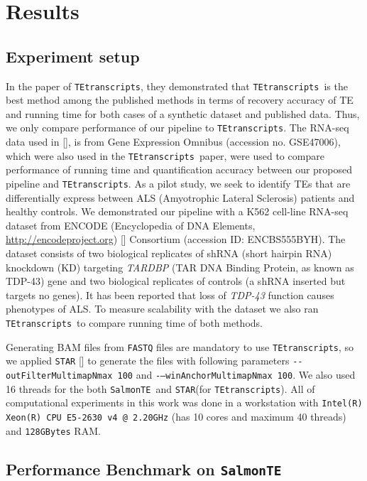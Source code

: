\documentclass{ws-procs11x85}
\newcommand{\TEtranscripts}{\texttt{TEtranscripts}}
\newcommand{\SalmonTE}{\texttt{SalmonTE}}
\begin{document}
\section{Results}

\subsection{Experiment setup}
In the paper of \TEtranscripts, they demonstrated that \TEtranscripts~is the best method among the published methods in terms of recovery accuracy of TE and running time for both cases of a synthetic dataset and published data. 
Thus, we only compare performance of our pipeline to \TEtranscripts. 
The RNA-seq data used in [], is from Gene Expression Omnibus (accession no. GSE47006), which were also used in the \TEtranscripts~paper, 
were used to compare performance of running time and quantification accuracy between
our proposed pipeline and \TEtranscripts.
As a pilot study, we seek to identify TEs that are  differentially express between ALS (Amyotrophic Lateral Sclerosis)  patients and healthy  controls.
We demonstrated our pipeline with a K562 cell-line RNA-seq dataset from ENCODE (Encyclopedia of DNA Elements, \url{http://encodeproject.org}) [] Consortium (accession ID: ENCBS555BYH). 
The dataset consists of two biological replicates of shRNA (short hairpin RNA) knockdown (KD)
targeting \textit{TARDBP} (TAR DNA Binding Protein, as known as TDP-43) gene and two biological replicates of controls 
(a shRNA inserted but targets no genes). 
It has been reported that loss of \textit{TDP-43} function causes phenotypes of 
ALS.\cite{yang2014partial,mihevc2016tdp} To measure scalability with the dataset
we also ran \TEtranscripts~to compare running time of both methods.


Generating BAM files from \verb|FASTQ| files are mandatory to use \TEtranscripts, so we applied \verb|STAR| [] to generate the files with following parameters
\verb|--outFilterMultimapNmax 100| and \verb|-–winAnchorMultimapNmax 100|. We also used 16 threads for the both \SalmonTE~and \verb|STAR|(for \TEtranscripts).
All of computational experiments in this work was done in a workstation with 
\verb|Intel(R) Xeon(R) CPU E5-2630 v4 @ 2.20GHz| (has 10 cores and maximum 40 threads) and \verb|128GBytes| RAM.


\subsection{Performance Benchmark on \SalmonTE}
\end{document}
